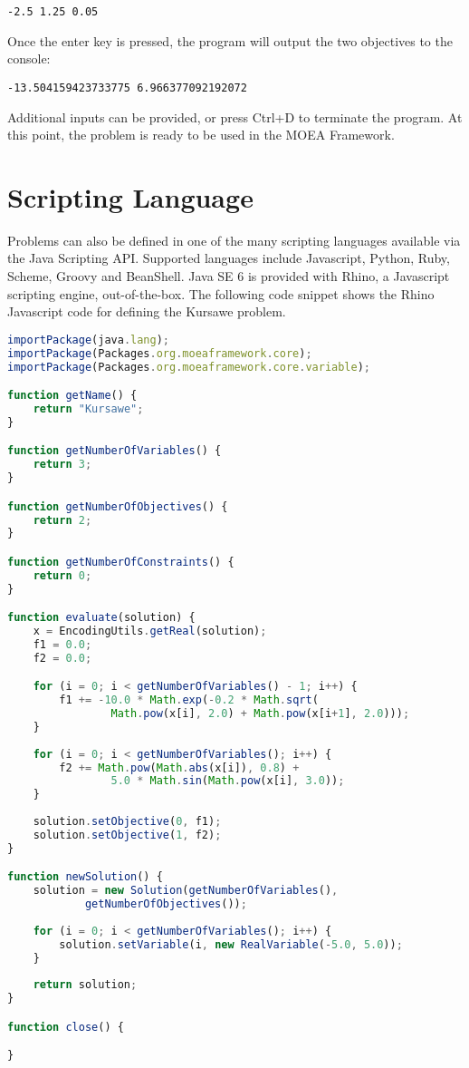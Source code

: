 \begin{lstlisting}[language=Plaintext]
-2.5 1.25 0.05
\end{lstlisting}

Once the enter key is pressed, the program will output the two objectives to the console:

\begin{lstlisting}[language=Plaintext]
-13.504159423733775 6.966377092192072
\end{lstlisting}

Additional inputs can be provided, or press Ctrl+D to terminate the program.  At this point, the problem is ready to be used in the MOEA Framework.

\section{Scripting Language}
Problems can also be defined in one of the many scripting languages available via the Java Scripting API.  Supported languages include Javascript, Python, Ruby, Scheme, Groovy and BeanShell.  Java SE 6 is provided with Rhino, a Javascript scripting engine, out-of-the-box.  The following code snippet shows the Rhino Javascript code for defining the Kursawe problem.

\begin{lstlisting}[language=JavaScript]
importPackage(java.lang);
importPackage(Packages.org.moeaframework.core);
importPackage(Packages.org.moeaframework.core.variable);

function getName() {
	return "Kursawe";
}

function getNumberOfVariables() {
	return 3;
}

function getNumberOfObjectives() {
	return 2;
}

function getNumberOfConstraints() {
	return 0;
}

function evaluate(solution) {
	x = EncodingUtils.getReal(solution);
	f1 = 0.0;
	f2 = 0.0;

	for (i = 0; i < getNumberOfVariables() - 1; i++) {
		f1 += -10.0 * Math.exp(-0.2 * Math.sqrt(
				Math.pow(x[i], 2.0) + Math.pow(x[i+1], 2.0)));
	}
 
	for (i = 0; i < getNumberOfVariables(); i++) {
		f2 += Math.pow(Math.abs(x[i]), 0.8) +  
				5.0 * Math.sin(Math.pow(x[i], 3.0));
	}
 
	solution.setObjective(0, f1);
	solution.setObjective(1, f2);
}

function newSolution() {
	solution = new Solution(getNumberOfVariables(), 
			getNumberOfObjectives());
 
	for (i = 0; i < getNumberOfVariables(); i++) {
		solution.setVariable(i, new RealVariable(-5.0, 5.0));
	}
 
	return solution;
}

function close() {

}
\end{lstlisting}

